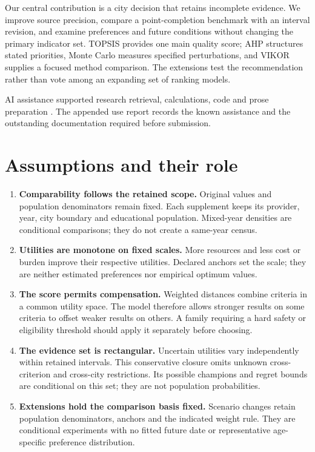 Our central contribution is a city decision that retains incomplete evidence.
We improve source precision, compare a point-completion benchmark with an
interval revision, and examine preferences and future conditions without
changing the primary indicator set. TOPSIS provides one main quality score;
AHP structures stated priorities, Monte Carlo measures specified perturbations,
and VIKOR supplies a focused method comparison. The extensions test the
recommendation rather than vote among an expanding set of ranking models.

AI assistance supported research retrieval, calculations, code and prose
preparation \cite{openai}. The appended use report records the known assistance
and the outstanding documentation required before submission.

\section{Assumptions and their role}
\begin{enumerate}
\item \textbf{Comparability follows the retained scope.} Original values and
population denominators remain fixed. Each supplement keeps its provider,
year, city boundary and educational population. Mixed-year densities are
conditional comparisons; they do not create a same-year census.
\item \textbf{Utilities are monotone on fixed scales.} More resources and less
cost or burden improve their respective utilities. Declared anchors set the
scale; they are neither estimated preferences nor empirical optimum values.
\item \textbf{The score permits compensation.} Weighted distances combine
criteria in a common utility space. The model therefore allows stronger results
on some criteria to offset weaker results on others. A family requiring a hard
safety or eligibility threshold should apply it separately before choosing.
\item \textbf{The evidence set is rectangular.} Uncertain utilities vary
independently within retained intervals. This conservative closure omits unknown
cross-criterion and cross-city restrictions. Its possible champions and regret
bounds are conditional on this set; they are not population probabilities.
\item \textbf{Extensions hold the comparison basis fixed.} Scenario changes
retain population denominators, anchors and the indicated weight rule. They
are conditional experiments with no fitted future date or representative
age-specific preference distribution.
\end{enumerate}


